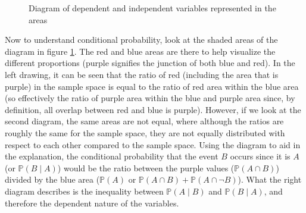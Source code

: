 \documentclass{article}
\begin{document}
\begin{figure}[H]
\caption{Diagram of dependent and independent variables represented in the areas} 
\label{fig: Diagram of dependent and independent variables represented in the areas}
\end{figure}

\par
Now to understand conditional probability, look at the shaded areas of the diagram in figure \ref{fig: Diagram of dependent and independent variables represented in the areas}. The red and blue areas are there to help visualize the different proportions (purple signifies the junction of both blue and red). In the left drawing, it can be seen that the ratio of red (including the area that is purple) in the sample space is equal to the ratio of red area within the blue area (so effectively the ratio of purple area within the blue and purple area since, by definition, all overlap between red and blue is purple). However, if we look at the second diagram, the same areas are not equal, where although the ratios are roughly the same for the sample space, they are not equally distributed with respect to each other compared to the sample space. Using the diagram to aid in the explanation, the conditional probability that the event $B$ occurs since it is $A$ (or $\mathbb{P}(B\mid A)$) would be the ratio between the purple values ($\mathbb{P}(A\cap B)$) divided by the blue area ($\mathbb{P}(A)$ or $\mathbb{P}(A\cap B) + \mathbb{P}(A\cap \neg B)$). What the right diagram describes is the inequality between $\mathbb{P}(A\mid B)$ and $\mathbb{P}(B\mid A)$, and therefore the dependent nature of the variables.
\end{document}
